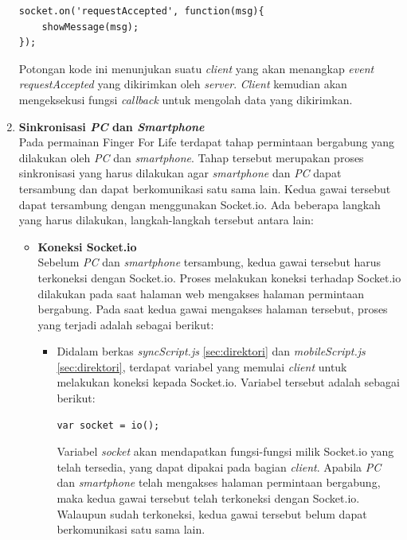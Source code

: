 \begin{enumerate}
\begin{lstlisting}[caption={Proses \textit{event} diterima}, label={lst:req_accepted}, captionpos=b]
socket.on('requestAccepted', function(msg){
	showMessage(msg);
});
\end{lstlisting}
Potongan kode ini menunjukan suatu \textit{client} yang akan menangkap \textit{event requestAccepted} yang dikirimkan oleh \textit{server}. \textit{Client} kemudian akan mengeksekusi fungsi \textit{callback} untuk mengolah data yang dikirimkan.
	
	\item \textbf{Sinkronisasi \textit{PC} dan \textit{Smartphone}} \\
	Pada permainan Finger For Life terdapat tahap permintaan bergabung yang dilakukan oleh \textit{PC} dan \textit{smartphone}. Tahap tersebut merupakan proses sinkronisasi yang harus dilakukan agar \textit{smartphone} dan \textit{PC} dapat tersambung dan dapat berkomunikasi satu sama lain. Kedua gawai tersebut dapat tersambung dengan menggunakan Socket.io. Ada beberapa langkah yang harus dilakukan, langkah-langkah tersebut antara lain:
	\begin{itemize}
		\item \textbf{Koneksi Socket.io} \\
		Sebelum \textit{PC} dan \textit{smartphone} tersambung, kedua gawai tersebut harus terkoneksi dengan Socket.io. Proses melakukan koneksi terhadap Socket.io dilakukan pada saat halaman web mengakses halaman permintaan bergabung. Pada saat kedua gawai mengakses halaman tersebut, proses yang terjadi adalah sebagai berikut:
		\begin{itemize}
			\item Didalam berkas \textit{syncScript.js} \ref{sec:direktori} dan \textit{mobileScript.js} \ref{sec:direktori}, terdapat variabel yang memulai \textit{client} untuk melakukan koneksi kepada Socket.io. Variabel tersebut adalah sebagai berikut:
\begin{lstlisting}[caption={Potongan kode untuk mendapatkan fungsi Socket.io pada \textit{client}}]
var socket = io();
\end{lstlisting}
			Variabel \textit{socket} akan mendapatkan fungsi-fungsi milik Socket.io yang telah tersedia, yang dapat dipakai pada bagian \textit{client}. Apabila \textit{PC} dan \textit{smartphone} telah mengakses halaman permintaan bergabung, maka kedua gawai tersebut telah terkoneksi dengan Socket.io. Walaupun sudah terkoneksi, kedua gawai tersebut belum dapat berkomunikasi satu sama lain.
		\end{itemize}
	

\end{itemize}
\end{enumerate}
